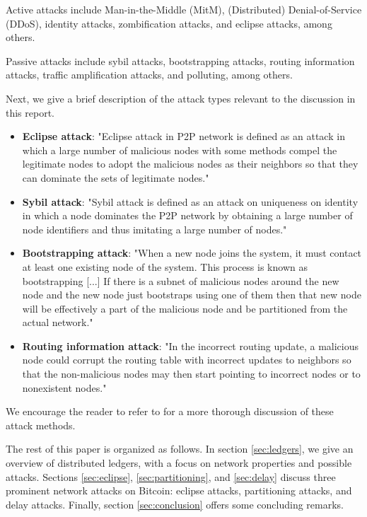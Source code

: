 \documentclass[12pt]{article}
\begin{document}
Active attacks include Man-in-the-Middle (MitM), (Distributed) Denial-of-Service (DDoS), identity attacks, zombification attacks, and eclipse attacks, among others.

Passive attacks include sybil attacks, bootstrapping attacks, routing information attacks, traffic amplification attacks, and polluting, among others.

Next, we give a brief description of the attack types relevant to the discussion in this report.

\begin{itemize}
    \item \textbf{Eclipse attack}: "Eclipse attack in P2P network is defined as an attack in which a large number of malicious nodes with some methods compel the legitimate nodes to adopt the malicious nodes as their neighbors so that they can dominate the sets of legitimate nodes."

    \item \textbf{Sybil attack}: "Sybil attack is defined as an attack on uniqueness on identity in which a node dominates the P2P network by obtaining a large number of node identifiers and thus imitating a large number of nodes."

    \item \textbf{Bootstrapping attack}: "When a new node joins the system, it must contact at least one existing node of the system. This process is known as bootstrapping [...] If there is a subnet of malicious nodes around the new node and the new node just bootstraps using one of them then that new node will be effectively a part of the malicious node and be partitioned from the actual network."

    \item \textbf{Routing information attack}: "In the incorrect routing update, a malicious node could corrupt the routing table with incorrect updates to neighbors so that the non-malicious nodes may then start pointing to incorrect nodes or to nonexistent nodes."
\end{itemize}

We encourage the reader to refer to \cite{P2PSecurityTaxonomy} for a more thorough discussion of these attack methods.

The rest of this paper is organized as follows. In section \ref{sec:ledgers}, we give an overview of distributed ledgers, with a focus on network properties and possible attacks. Sections \ref{sec:eclipse}, \ref{sec:partitioning}, and \ref{sec:delay} discuss three prominent network attacks on Bitcoin: eclipse attacks, partitioning attacks, and delay attacks. Finally, section \ref{sec:conclusion} offers some concluding remarks.
\end{document}
